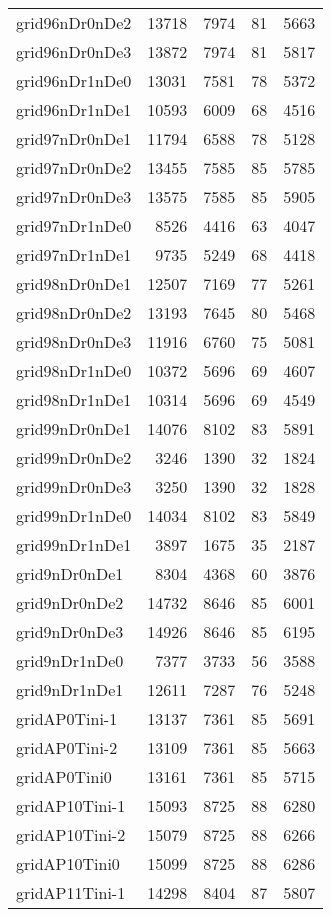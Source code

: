 \begin{longtable}{lrrrr}
grid96nDr0nDe2 & 13718 & 7974 & 81 & 5663 \\
grid96nDr0nDe3 & 13872 & 7974 & 81 & 5817 \\
grid96nDr1nDe0 & 13031 & 7581 & 78 & 5372 \\
grid96nDr1nDe1 & 10593 & 6009 & 68 & 4516 \\
grid97nDr0nDe1 & 11794 & 6588 & 78 & 5128 \\
grid97nDr0nDe2 & 13455 & 7585 & 85 & 5785 \\
grid97nDr0nDe3 & 13575 & 7585 & 85 & 5905 \\
grid97nDr1nDe0 & 8526 & 4416 & 63 & 4047 \\
grid97nDr1nDe1 & 9735 & 5249 & 68 & 4418 \\
grid98nDr0nDe1 & 12507 & 7169 & 77 & 5261 \\
grid98nDr0nDe2 & 13193 & 7645 & 80 & 5468 \\
grid98nDr0nDe3 & 11916 & 6760 & 75 & 5081 \\
grid98nDr1nDe0 & 10372 & 5696 & 69 & 4607 \\
grid98nDr1nDe1 & 10314 & 5696 & 69 & 4549 \\
grid99nDr0nDe1 & 14076 & 8102 & 83 & 5891 \\
grid99nDr0nDe2 & 3246 & 1390 & 32 & 1824 \\
grid99nDr0nDe3 & 3250 & 1390 & 32 & 1828 \\
grid99nDr1nDe0 & 14034 & 8102 & 83 & 5849 \\
grid99nDr1nDe1 & 3897 & 1675 & 35 & 2187 \\
grid9nDr0nDe1 & 8304 & 4368 & 60 & 3876 \\
grid9nDr0nDe2 & 14732 & 8646 & 85 & 6001 \\
grid9nDr0nDe3 & 14926 & 8646 & 85 & 6195 \\
grid9nDr1nDe0 & 7377 & 3733 & 56 & 3588 \\
grid9nDr1nDe1 & 12611 & 7287 & 76 & 5248 \\
gridAP0Tini-1 & 13137 & 7361 & 85 & 5691 \\
gridAP0Tini-2 & 13109 & 7361 & 85 & 5663 \\
gridAP0Tini0 & 13161 & 7361 & 85 & 5715 \\
gridAP10Tini-1 & 15093 & 8725 & 88 & 6280 \\
gridAP10Tini-2 & 15079 & 8725 & 88 & 6266 \\
gridAP10Tini0 & 15099 & 8725 & 88 & 6286 \\
gridAP11Tini-1 & 14298 & 8404 & 87 & 5807 \\

\end{longtable}
